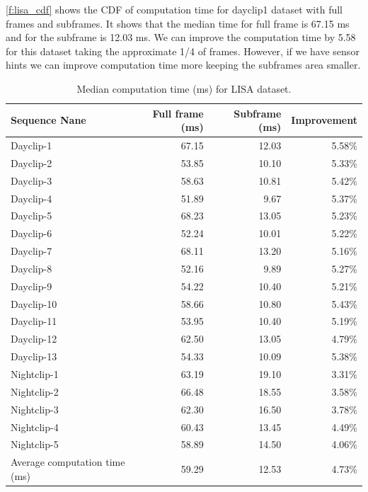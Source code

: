 \ref{f:lisa_cdf} shows the CDF of computation time for dayclip1 dataset with full frames and subframes.
It shows that the median time for full frame is 67.15 ms and for the subframe is 12.03 ms.
We can improve the computation time by 5.58 for this dataset taking the approximate 1/4 of frames.
However, if we have sensor hints we can improve computation time more keeping the subframes area smaller.




\begin{table}[!ht]
  \centering
  
  \begin{tabular}{  l   r   r  r}
    \rowcolor{gray!50}
    Sequence Nane &  Full frame (ms)  &  Subframe (ms) & Improvement \\
    \hline
    Dayclip-1 & 67.15 & 12.03 & 5.58\% \\
    Dayclip-2 & 53.85 & 10.10 & 5.33\% \\
    Dayclip-3 & 58.63 & 10.81 & 5.42\% \\
    Dayclip-4 & 51.89 & 9.67 & 5.37\% \\
    Dayclip-5 & 68.23 & 13.05 & 5.23\% \\
    Dayclip-6 & 52.24 & 10.01 & 5.22\% \\
    Dayclip-7 & 68.11  & 13.20 & 5.16\% \\
    Dayclip-8 & 52.16  & 9.89  & 5.27\% \\
    Dayclip-9 & 54.22  & 10.40  & 5.21\% \\
    Dayclip-10 & 58.66 & 10.80 & 5.43\% \\
    Dayclip-11 & 53.95 & 10.40 & 5.19\% \\
    Dayclip-12 & 62.50  & 13.05 & 4.79\% \\
    Dayclip-13 & 54.33 & 10.09 & 5.38\% \\
    Nightclip-1 & 63.19 & 19.10 & 3.31\% \\
    Nightclip-2 & 66.48 & 18.55 & 3.58\% \\
    Nightclip-3 & 62.30 & 16.50 & 3.78\% \\
    Nightclip-4 & 60.43 & 13.45 & 4.49\% \\
    Nightclip-5 & 58.89 & 14.50 & 4.06\% \\
    \hline
    Average computation time (ms) & 59.29 & 12.53 & 4.73\% \\
    
  \end{tabular}
  \caption{Median computation time (ms) for LISA dataset.}
  \label{t:lisa_time}
\end{table}

